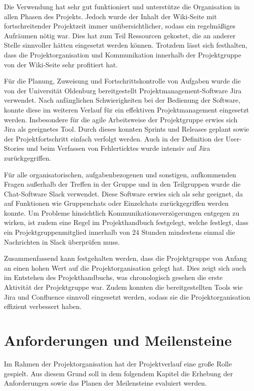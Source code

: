 Die Verwendung hat sehr gut funktioniert und unterstütze die Organisation in allen Phasen des Projekts.
Jedoch wurde der Inhalt der Wiki-Seite mit fortschreitender Projektzeit immer unübersichtlicher, sodass ein regelmäßiges Aufräumen nötig war.
Dies hat zum Teil Ressourcen gekostet, die an anderer Stelle sinnvoller hätten eingesetzt werden können. 
Trotzdem lässt sich festhalten, dass die Projektorganisation und Kommunikation innerhalb der Projektgruppe von der Wiki-Seite sehr profitiert hat.\par\medskip
Für die Planung, Zuweisung und Fortschrittskontrolle von Aufgaben wurde die von der Universität Oldenburg bereitgestellt Projektmanagement-Software Jira verwendet. 
Nach anfänglichen Schwierigkeiten bei der Bedienung der Software, konnte diese im weiteren Verlauf für ein effektiven Projektmanagement eingesetzt werden.
Insbesondere für die agile Arbeitsweise der Projektgruppe erwies sich Jira als geeignetes Tool.
Durch dieses konnten Sprints und Releases geplant sowie der Projektfortschritt einfach verfolgt werden. 
Auch in der Definition der User-Stories und beim Verfassen von Fehlerticktes wurde intensiv auf Jira zurückgegriffen.\par\medskip
Für alle organisatorischen, aufgabenbezogenen und sonstigen, aufkommenden Fragen außerhalb der Treffen in der Gruppe und in den Teilgruppen wurde die Chat-Software Slack verwendet. 
Diese Software erwies sich als sehr geeignet, da auf Funktionen wie Gruppenchats oder Einzelchats zurückgegriffen werden konnte. 
Um Probleme hinsichtlich Kommunikationsverzögerungen entgegen zu wirken, ist zudem eine Regel im Projekthandbuch festgelegt, welche festlegt, dass ein Projektgruppenmitglied innerhalb von 24 Stunden mindestens einmal die Nachrichten in Slack überprüfen muss.


Zusammenfassend kann festgehalten werden, dass die Projektgruppe von Anfang an einen hohen Wert auf die Projektorganisation gelegt hat. 
Dies zeigt sich auch im Entstehen des Projekthandbuchs, was chronologisch gesehen die erste Aktivität der Projektgruppe war. 
Zudem konnten die bereitgestellten Tools wie Jira und Confluence sinnvoll eingesetzt werden, sodass sie die Projektorganisation effizient verbessert haben.

\section{Anforderungen und Meilensteine}
Im Rahmen der Projektorganisation hat der Projektverlauf eine große Rolle gespielt. 
Aus diesem Grund soll in dem folgendem Kapitel die Erhebung der Anforderungen sowie das Planen der Meilensteine evaluiert werden.


